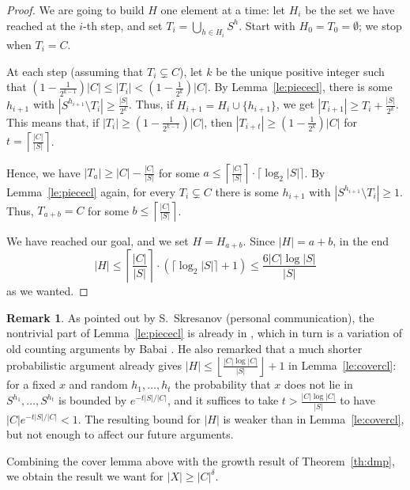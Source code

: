 \documentclass[a4paper]{article}
\theoremstyle{definition}
\newtheorem{remark}[proposition]{Remark}
\numberwithin{equation}{section}
\begin{document}
\begin{proof}
We are going to build $H$ one element at a time: let $H_{i}$ be the set we have reached at the $i$-th step, and set $T_{i}=\bigcup_{h\in H_{i}}S^{h}$. Start with $H_{0}=T_{0}=\emptyset$; we stop when $T_{i}=C$.

At each step (assuming that $T_{i}\subsetneq C$), let $k$ be the unique positive integer such that $\left(1-\frac{1}{2^{k-1}}\right)|C|\leq|T_{i}|<\left(1-\frac{1}{2^{k}}\right)|C|$. By Lemma~\ref{le:piececl}, there is some $h_{i+1}$ with $|S^{h_{i+1}}\setminus T_{i}|\geq\frac{|S|}{2^{k}}$. Thus, if $H_{i+1}=H_{i}\cup\{h_{i+1}\}$, we get $|T_{i+1}|\geq T_{i}+\frac{|S|}{2^{k}}$. This means that, if $|T_{i}|\geq\left(1-\frac{1}{2^{k-1}}\right)|C|$, then $|T_{i+t}|\geq\left(1-\frac{1}{2^{k}}\right)|C|$ for $t=\left\lceil\frac{|C|}{|S|}\right\rceil$.

Hence, we have $|T_{a}|\geq|C|-\frac{|C|}{|S|}$ for some $a\leq\left\lceil\frac{|C|}{|S|}\right\rceil\cdot\lceil\log_{2}|S|\rceil$. By Lemma~\ref{le:piececl} again, for every $T_{i}\subsetneq C$ there is some $h_{i+1}$ with $|S^{h_{i+1}}\setminus T_{i}|\geq 1$. Thus, $T_{a+b}=C$ for some $b\leq\left\lceil\frac{|C|}{|S|}\right\rceil$.

We have reached our goal, and we set $H=H_{a+b}$. Since $|H|=a+b$, in the end
\begin{equation*}
|H|\leq \left\lceil\frac{|C|}{|S|}\right\rceil\cdot(\lceil\log_{2}|S|\rceil+1)\leq\frac{6|C|\log|S|}{|S|}
\end{equation*}
as we wanted.
\end{proof}

\begin{remark}
As pointed out by S.~Skresanov (personal communication), the nontrivial part of Lemma~\ref{le:piececl} is already in \cite[Lemma 2]{DeV23}, which in turn is a variation of old counting arguments by Babai \cite{Bab80c}. He also remarked that a much shorter probabilistic argument already gives $|H|\leq\left\lfloor\frac{|C|\log|C|}{|S|}\right\rfloor+1$ in Lemma~\ref{le:covercl}: for a fixed $x$ and random $h_{1},\ldots,h_{t}$ the probability that $x$ does not lie in $S^{h_{1}},\ldots,S^{h_{t}}$ is bounded by $e^{-t|S|/|C|}$, and it suffices to take $t>\frac{|C|\log|C|}{|S|}$ to have $|C|e^{-t|S|/|C|}<1$. The resulting bound for $|H|$ is weaker than in Lemma~\ref{le:covercl}, but not enough to affect our future arguments.
\end{remark}

Combining the cover lemma above with the growth result of Theorem~\ref{th:dmp}, we obtain the result we want for $|X|\geq|C|^{\delta}$.
\end{document}
